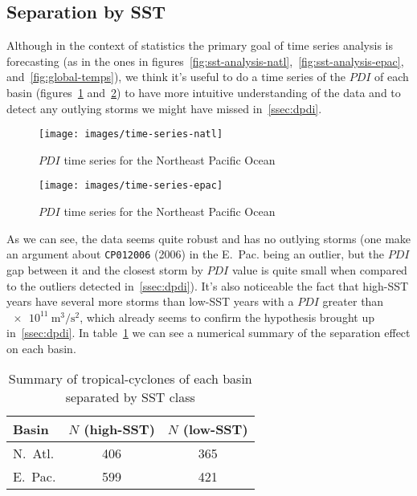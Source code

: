 \subsection{Separation by SST}\label{sec:pdi-vs-sst}
Although in the context of statistics the primary goal of time series analysis is forecasting (as in the ones in figures~\ref{fig:sst-analysis-natl},~\ref{fig:sst-analysis-epac}, and~\ref{fig:global-temps}), we think it's useful to do a time series of the $PDI$ of each basin (figures~\ref{fig:time-series-natl} and~\ref{fig:time-series-epac}) to have more intuitive understanding of the data and to detect any outlying storms we might have missed in~\cref{ssec:dpdi}.

\begin{figure}[H]
	\centering
	\texttt{[image: images/time-series-natl]}
	\caption{$PDI$ time series for the Northeast Pacific Ocean}
	\label{fig:time-series-natl}
\end{figure}

\begin{figure}[H]
	\centering
	\texttt{[image: images/time-series-epac]}
	\caption{$PDI$ time series for the Northeast Pacific Ocean}
	\label{fig:time-series-epac}
\end{figure}

As we can see, the data seems quite robust and has no outlying storms (one make an argument about \texttt{CP012006} (2006) in the E.~Pac. being an outlier, but the $PDI$ gap between it and the closest storm by $PDI$ value is quite small when compared to the outliers detected in~\cref{ssec:dpdi}). It's also noticeable the fact that high-SST years have several more storms than low-SST years with a $PDI$ greater than $\SI{e11}{\cubic\m\per\square\s}$, which already seems to confirm the hypothesis brought up in~\cref{ssec:dpdi}. In table~\ref{tab:storms-by-sst-class} we can see a numerical summary of the separation effect on each basin.

\begin{table}[H]
	\centering
	\begin{tabular}{l c c}
		\toprule
		\toprule
		Basin   & $N$ (high-SST) & $N$ (low-SST) \\
		\midrule
		N.~Atl. & \num{406}      & \num{365} \\
		E.~Pac. & \num{599}      & \num{421} \\
		\bottomrule
	\end{tabular}
	\caption{Summary of tropical-cyclones of each basin separated by SST class}
	\label{tab:storms-by-sst-class}
\end{table}


